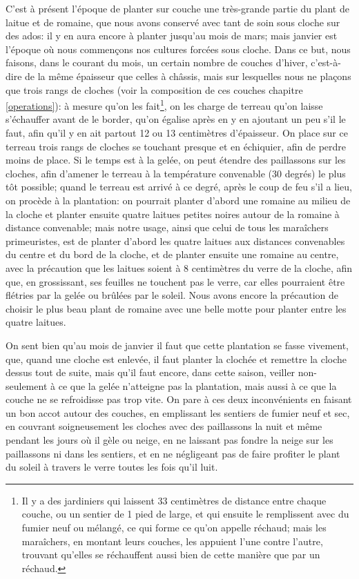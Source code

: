 \documentclass[10pt,a4paper]{book}
\begin{document}
C'est à présent l'époque de planter sur couche une très-grande partie du plant de laitue et de romaine, que nous avons conservé avec tant de soin sous cloche sur des ados: il y en aura encore à planter jusqu'au mois de mars; mais janvier est l'époque où nous commençons nos cultures forcées sous cloche. Dans ce but, nous faisons, dans le courant du mois, un certain nombre de couches d'hiver, c'est-à-dire de la même épaisseur que celles à châssis, mais sur lesquelles nous ne plaçons que trois rangs de cloches (voir la composition de ces couches chapitre \ref{operations}): à mesure qu'on les fait\footnote{Il y a des jardiniers qui laissent 33 centimètres de distance entre chaque couche, ou un sentier de 1 pied de large, et qui ensuite le remplissent avec du fumier neuf ou mélangé, ce qui forme ce qu'on appelle réchaud; mais les maraîchers, en montant leurs couches, les appuient l'une contre l'autre, trouvant qu'elles se réchauffent aussi bien de cette manière que par un réchaud.}, on les charge de terreau qu'on laisse s'échauffer avant de le border, qu'on égalise après en y en ajoutant un peu s'il le faut, afin qu'il y en ait partout 12 ou 13 centimètres d'épaisseur. On place sur ce terreau trois rangs de cloches se touchant presque et en échiquier, afin de perdre moins de place. Si le temps est à la gelée, on peut étendre des paillassons sur les cloches, afin d'amener le terreau à la température convenable (30 degrés) le plus tôt possible; quand le terreau est arrivé à ce degré, après le coup de feu s'il a lieu, on procède à la plantation: on pourrait planter d'abord une romaine au milieu de la cloche et planter ensuite quatre laitues petites noires autour de la romaine à distance convenable; mais notre usage, ainsi que celui de tous les maraîchers primeuristes, est de planter d'abord les quatre laitues aux distances convenables du centre et du bord de la cloche, et de planter ensuite une romaine au centre, avec la précaution que les laitues soient à 8 centimètres du verre de la cloche, afin que, en grossissant, ses feuilles ne touchent pas le verre, car elles pourraient être flétries par la gelée ou brûlées par le soleil. Nous avons encore la précaution de choisir le plus beau plant de romaine avec une belle motte pour planter entre les quatre laitues.

On sent bien qu'au mois de janvier il faut que cette plantation se fasse vivement, que, quand une cloche est enlevée, il faut planter la clochée et remettre la cloche dessus tout de suite, mais qu'il faut encore, dans cette saison, veiller non-seulement à ce que la gelée n'atteigne pas la plantation, mais aussi à ce que la couche ne se refroidisse pas trop vite. On pare à ces deux inconvénients en faisant un bon accot autour des couches, en emplissant les sentiers de fumier neuf et sec, en couvrant soigneusement les cloches avec des paillassons la nuit et même pendant les jours où il gèle ou neige, en ne laissant pas fondre la neige sur les paillassons ni dans les sentiers, et en ne négligeant pas de faire profiter le plant du soleil à travers le verre toutes les fois qu'il luit.
\end{document}
